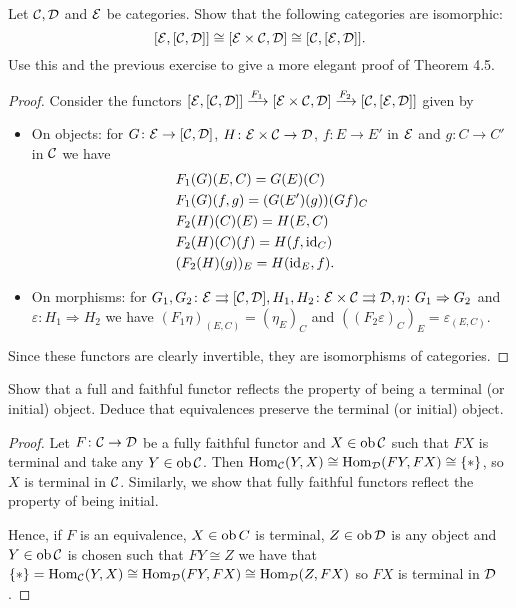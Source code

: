 \begin{exercise}{45}
    Let $\mathcal{C}, \mathcal{D}$ and $\mathcal{E}$ be categories. Show that the following categories are isomorphic:
    \[ [\mathcal{E}, [\mathcal{C}, \mathcal{D}]]\cong [\mathcal{E}\times\mathcal{C}, \mathcal{D}]\cong [\mathcal{C}, [\mathcal{E}, \mathcal{D}]]. \]
    Use this and the previous exercise to give a more elegant proof of Theorem 4.5.
\end{exercise}
\begin{solution}
    \begin{proof}
        Consider the functors $[\mathcal{E}, [\mathcal{C}, \mathcal{D}]]\xrightarrow{F_1} [\mathcal{E}\times\mathcal{C}, \mathcal{D}]\xrightarrow{F_2}[\mathcal{C}, [\mathcal{E}, \mathcal{D}]]$ given by
        \begin{itemize}
            \item On objects: for $G\colon\mathcal{E}\to [\mathcal{C}, \mathcal{D}]$, $H\colon\mathcal{E}\times\mathcal{C}\to\mathcal{D}$, $f\colon E\to E'$ in $\mathcal{E}$ and $g\colon C\to C'$ in $\mathcal{C}$ we have 
                \begin{align*}
                    &F_1(G)(E, C)= G(E)(C)\\
                    &F_1(G)(f,g)=(G(E')(g))(G f)_C\\
                    &F_2(H)(C)(E)=H(E,C)\\
                    &F_2(H)(C)(f)=H(f,\operatorname{id}_C)\\
                    &(F_2(H)(g))_E= H(\operatorname{id}_E, f).
                \end{align*}
            \item On morphisms: for $G_1,G_2\colon\mathcal{E}\rightrightarrows [\mathcal{C}, \mathcal{D}], H_1,H_2\colon\mathcal{E}\times\mathcal{C}\rightrightarrows\mathcal{D}, \eta\colon G_1\Rightarrow G_2$ and $\varepsilon\colon H_1\Rightarrow H_2$ we have $(F_1\eta)_{(E,C)} = (\eta_E)_C$ and
            $((F_2\varepsilon)_C)_E=\varepsilon_{(E,C)}.$
        \end{itemize}
        Since these functors are clearly invertible, they are isomorphisms of categories.


    \end{proof}
\end{solution}

\begin{exercise}{46}
    Show that a full and faithful functor reflects the property of being a terminal (or initial) object. 
    Deduce that equivalences preserve the terminal (or initial) object.
\end{exercise}
\begin{solution}
    \begin{proof}
        Let $F\colon\mathcal{C}\to\mathcal{D}$ be a fully faithful functor and $X\in\operatorname{ob}\mathcal{C}$ such that $FX$ is terminal and take any $Y\in\operatorname{ob}\mathcal{C}$.
        Then $\operatorname{Hom}_{\mathcal{C}}(Y, X)\cong\operatorname{Hom}_{\mathcal{D}}(FY, FX)\cong\{*\}$, so $X$ is terminal in $\mathcal{C}$. 
        Similarly, we show that fully faithful functors reflect the property of being initial.

        Hence, if $F$ is an equivalence, $X\in\operatorname{ob} C$ is terminal, $Z\in\operatorname{ob}\mathcal{D}$ is any object and $Y\in\operatorname{ob}\mathcal{C}$ is chosen such that $FY\cong Z$ we have that $\{*\}=\operatorname{Hom}_{\mathcal{C}}(Y,X)\cong\operatorname{Hom}_{\mathcal{D}}(FY, FX)\cong\operatorname{Hom}_{\mathcal{D}}(Z,FX)$ so $FX$ is terminal in $\mathcal{D}$.
    \end{proof}
\end{solution}